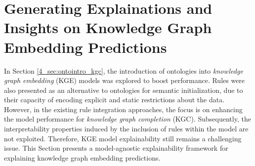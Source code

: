 \section{Generating Explainations and Insights on Knowledge Graph Embedding Predictions}\label{6_sec:geni_main}
In Section \ref{4_sec:ontointro_kgc}, the introduction of ontologies into \textit{knowledge graph embedding} (KGE) models was explored to boost performance. Rules were also presented as an alternative to ontologies for semantic initialization, due to their capacity of encoding explicit and static restrictions about the data. However, in the existing rule integration approaches, the focus is on enhancing the model performance for \textit{knowledge graph completion} (KGC). Subsequently, the interpretability properties induced by the inclusion of rules within the model are not exploited. Therefore, KGE model explainability still remains a challenging issue. This Section presents a model-agnostic explainability framework for explaining knowledge graph embedding predictions.


